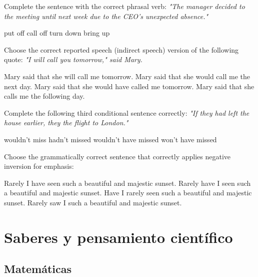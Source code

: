 \documentclass[12pt]{evaluasep}
\begin{document}
\begin{questions}
    \question Complete the sentence with the correct phrasal verb: \textit{"The manager decided to \underline{\hspace{2cm}} the meeting until next week due to the CEO's unexpected absence."}
    \begin{choices}
        \CorrectChoice put off
        \choice call off
        \choice turn down
        \choice bring up
    \end{choices}
    \vspace{0.3cm}

    \question Choose the correct reported speech (indirect speech) version of the following quote: \textit{"I will call you tomorrow," said Mary.}
    \begin{choices}
        \choice Mary said that she will call me tomorrow.
        \CorrectChoice Mary said that she would call me the next day.
        \choice Mary said that she would have called me tomorrow.
        \choice Mary said that she calls me the following day.
    \end{choices}
    \vspace{0.3cm}

    \question Complete the following third conditional sentence correctly: \textit{"If they had left the house earlier, they \underline{\hspace{2cm}} the flight to London."}
    \begin{choices}
        \choice wouldn't miss
        \choice hadn't missed
        \CorrectChoice wouldn't have missed
        \choice won't have missed
    \end{choices}
    \vspace{0.3cm}

    \question Choose the grammatically correct sentence that correctly applies negative inversion for emphasis:
    \begin{choices}
        \choice Rarely I have seen such a beautiful and majestic sunset.
        \CorrectChoice Rarely have I seen such a beautiful and majestic sunset.
        \choice Have I rarely seen such a beautiful and majestic sunset.
        \choice Rarely saw I such a beautiful and majestic sunset.
    \end{choices}
              
    \newpage

\section{Saberes y pensamiento científico}
\subsection{Matemáticas}


\end{questions}
\end{document}
